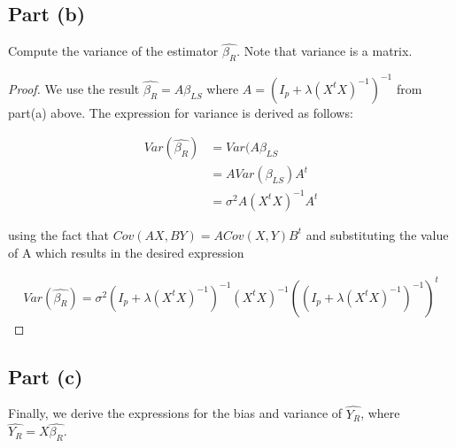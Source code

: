 \documentclass[paper=a4, fontsize=11pt]{scrartcl} %
\numberwithin{equation}{section} %
\begin{document}
\subsection*{Part (b)}

Compute the variance of the estimator $\hat{\beta_R}$. Note that variance is a matrix.

\begin{proof}

We use the result $\hat{\beta_R} = A \beta_{LS}$ where $A = (I_p + \lambda(X^t X)^{-1})^{-1}$ from part(a) above. The expression for variance is derived as follows:

\begin{align}
Var(\hat{\beta_R}) &= Var(A \beta_{LS} \\
&= A Var(\beta_{LS}) A^t \\
&= \sigma^2 A (X^t X)^{-1} A^t
\end{align}

using the fact that $Cov(AX, BY) = A Cov(X, Y) B^t$ and substituting the value of A which results in the desired expression 

\begin{align}
Var(\hat{\beta_R}) = \sigma^2 (I_p + \lambda(X^t X)^{-1})^{-1} (X^t X)^{-1} ((I_p + \lambda(X^t X)^{-1})^{-1})^t
\end{align}

\end{proof}

\subsection*{Part (c)}

Finally, we derive the expressions for the bias and variance of $\hat{Y_R}$, where $\hat{Y_R} = X \hat{\beta_R}$.
\end{document}

